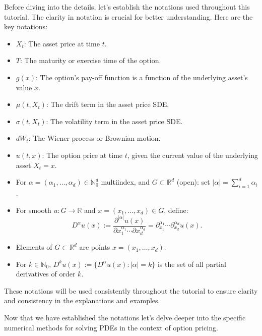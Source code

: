 Before diving into the details, let's establish the notations used throughout this tutorial. The clarity in notation is crucial for better understanding. Here are the key notations:

\begin{itemize}
    \item $X_t$: The asset price at time $t$.
    \item $T$: The maturity or exercise time of the option.
    \item $g(x)$: The option's pay-off function is a function of the underlying asset's value $x$.
    \item $\mu(t, X_t)$: The drift term in the asset price SDE.
    \item $\sigma(t, X_t)$: The volatility term in the asset price SDE.
    \item $dW_t$: The Wiener process or Brownian motion.
    \item $u(t, x)$: The option price at time $t$, given the current value of the underlying asset $X_t = x$.
    \item For $\alpha = (\alpha_1, \ldots, \alpha_d) \in \mathbb{N}_0^d$ multiindex, and $G \subset \mathbb{R}^d$ (open): set $|\alpha| = \sum_{i=1}^{d} \alpha_i$.
    \item For smooth $u : G \rightarrow \mathbb{R}$ and $x = (x_1, \ldots, x_d) \in G$, define:
    \[
    D^\alpha u(x) := \frac{{\partial^{|\alpha|} u(x)}}{{\partial x_1^{\alpha_1} \cdots \partial x_d^{\alpha_d}}} = {\partial^{\alpha_1}_{x_1}} \cdots {\partial^{\alpha_d}_{x_d}} u(x).
    \]
    \item Elements of $G \subset \mathbb{R}^d$ are points $x = (x_1, \ldots, x_d)$.
    \item For $k \in \mathbb{N}_0$, $D^k u(x) := \{D^\alpha u(x) : |\alpha| = k\}$ is the set of all partial derivatives of order $k$.
\end{itemize}

These notations will be used consistently throughout the tutorial to ensure clarity and consistency in the explanations and examples.

Now that we have established the notations let's delve deeper into the specific numerical methods for solving PDEs in the context of option pricing.
